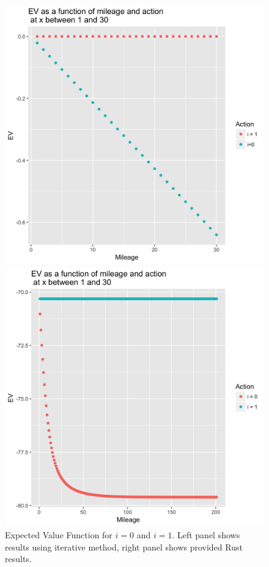 \documentclass[paper=a4, fontsize=11pt]{scrartcl} %
\numberwithin{equation}{section} %
\numberwithin{figure}{section} %
\numberwithin{table}{section} %
\begin{document}
\begin{itemize}
\begin{itemize}
\begin{figure}[ht!]
\centering
	\begin{minipage}[b]{.46\linewidth}
		\includegraphics[scale=.1]{ev_plot.png}
	\end{minipage}
	\begin{minipage}[b]{.46\linewidth}
		\includegraphics[scale=.1]{ev_plot_rust.png}
	\end{minipage}
\caption{Expected Value Function for $i = 0$ and $i = 1$. Left panel shows results using iterative method, right panel shows provided Rust results.} 
\label{fig:ev_plot}
\end{figure} 


\end{itemize}
\end{itemize}
\end{document}
